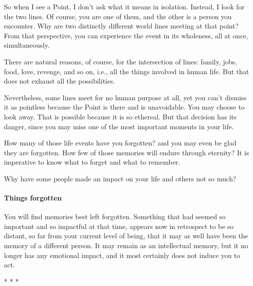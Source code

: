So when I see a Point, I don't ask what it means in isolation. Instead, I look for the two lines. Of course, you are one of them, and the other is a person you encounter. Why are two distinctly different world lines meeting at that point? From that perspective, you can experience the event in its wholeness, all at once, simultaneously.

There are natural reasons, of course, for the intersection of lines: family, jobs, food, love, revenge, and so on, i.e., all the things involved in human life. But that does not exhaust all the possibilities.

Nevertheless, some lines meet for no human purpose at all, yet you can't dismiss it as pointless because the Point is there and is unavoidable. You may choose to look away. That is possible because it is so ethereal. But that decision has its danger, since you may miss one of the most important moments in your life.

How many of those life events have you forgotten? and you may even be glad they are forgotten. How few of those memories will endure through eternity? It is imperative to know what to forget and what to remember.

Why have some people made an impact on your life and others not so much?

\paragraph{Things forgotten}


You will find memories best left forgotten. Something that had seemed so important and so impactful at that time, appears now in retrospect to be so distant, so far from your current level of being, that it may as well have been the memory of a different person. It may remain as an intellectual memory, but it no longer has any emotional impact, and it most certainly does not induce you to act.


\begin{center}* * *\end{center}

